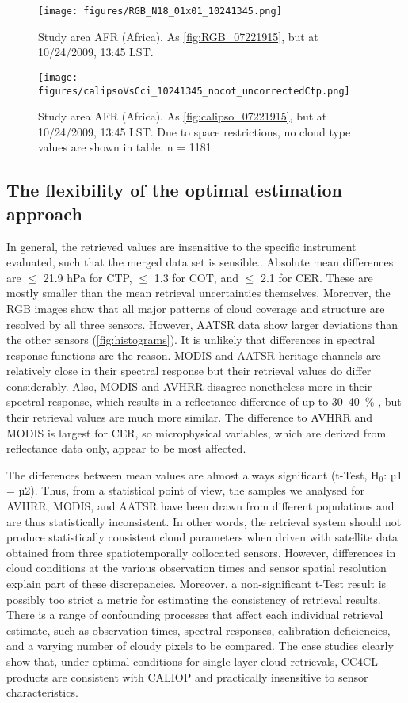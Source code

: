 \begin{figure*}[h]
  \texttt{[image: figures/RGB\_N18\_01x01\_10241345.png]} %
  \caption{Study area AFR (Africa). As \autoref{fig:RGB_07221915}, but at 10/24/2009, 13:45 LST.}
  \label{fig:RGB_10241345}
  \texttt{[image: figures/calipsoVsCci\_10241345\_nocot\_uncorrectedCtp.png]}
  \caption{Study area AFR (Africa). As \autoref{fig:calipso_07221915}, but at 10/24/2009, 13:45 LST. Due to space restrictions, no cloud type values are shown in table. n = 1181} 
  \label{fig:calipso_10241345}
\end{figure*}

\conclusions[Discussion]\label{discussion}

\subsection{The flexibility of the optimal estimation approach}

In general, the retrieved values are insensitive to the specific instrument evaluated, such that the merged data set is sensible.. Absolute mean differences are $\leq$ 21.9 hPa for CTP, $\leq$ 1.3 for COT, and $\leq$ 2.1 for CER. These are mostly smaller than the mean retrieval uncertainties themselves. Moreover, the RGB images show that all major patterns of cloud coverage and structure are resolved by all three sensors. However, AATSR data show larger deviations than the other sensors (\cref{fig:histograms}). It is unlikely that differences in spectral response functions are the reason. MODIS and AATSR heritage channels are relatively close in their spectral response but their retrieval values do differ considerably. Also, MODIS and AVHRR disagree nonetheless more in their spectral response, which results in a reflectance difference of up to 30--40~\% \citep{Trishchenko02}, but their retrieval values are much more similar. The difference to AVHRR and MODIS is largest for CER, so microphysical variables, which are derived from reflectance data only, appear to be most affected. 

The differences between mean values are almost always significant (t-Test, H$_0$: µ1 = µ2). Thus, from a statistical point of view, the samples we analysed for AVHRR, MODIS, and AATSR have been drawn from different populations and are thus statistically inconsistent. In other words, the retrieval system should not produce statistically consistent cloud parameters when driven with satellite data obtained from three spatiotemporally collocated sensors. However, differences in cloud conditions at the various observation times and sensor spatial resolution explain part of these discrepancies. Moreover, a non-significant t-Test result is possibly too strict a metric for estimating the consistency of retrieval results. There is a range of confounding processes that affect each individual retrieval estimate, such as observation times, spectral responses, calibration deficiencies, and a varying number of cloudy pixels to be compared. The case studies clearly show that, under optimal conditions for single layer cloud retrievals, CC4CL products are consistent with CALIOP and practically insensitive to sensor characteristics.

